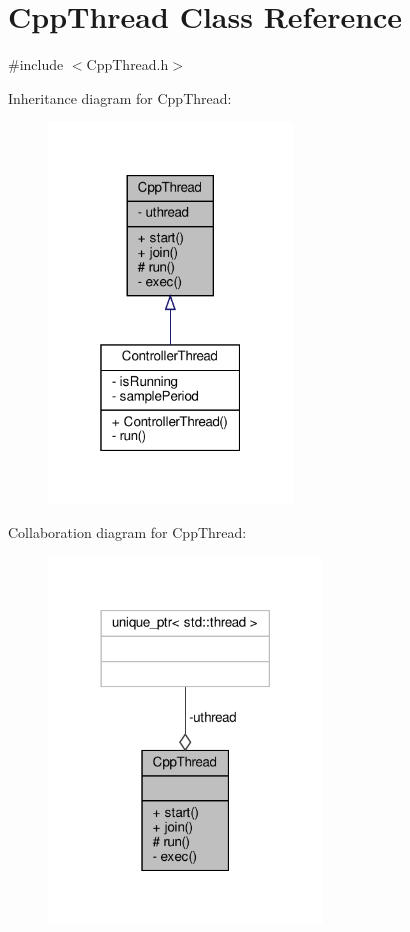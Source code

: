 \hypertarget{classCppThread}{}\section{Cpp\+Thread Class Reference}
\label{classCppThread}


{\ttfamily \#include $<$Cpp\+Thread.\+h$>$}



Inheritance diagram for Cpp\+Thread\+:\nopagebreak
\begin{figure}[H]
\begin{center}
\leavevmode
\includegraphics[width=184pt]{classCppThread__inherit__graph}
\end{center}
\end{figure}


Collaboration diagram for Cpp\+Thread\+:\nopagebreak
\begin{figure}[H]
\begin{center}
\leavevmode
\includegraphics[width=206pt]{classCppThread__coll__graph}
\end{center}
\end{figure}
